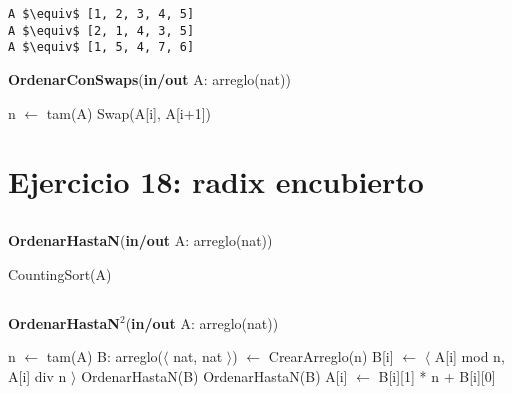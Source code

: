 \begin{lstlisting}
A $\equiv$ [1, 2, 3, 4, 5]
A $\equiv$ [2, 1, 4, 3, 5]
A $\equiv$ [1, 5, 4, 7, 6]
\end{lstlisting}

\begin{algorithm}[H]
\caption{
    \textbf{OrdenarConSwaps}(\textbf{in/out} A: arreglo(nat))
}
\begin{algorithmic}[1]
    \State n $\gets$ tam(A)
     
            \State Swap(A[i], A[i+1])
        \EndIf
    \EndFor
\end{algorithmic}
\end{algorithm}

\section{Ejercicio 18: radix encubierto}

\subsection{}

\begin{algorithm}[H]
\caption{
    \textbf{OrdenarHastaN}(\textbf{in/out} A: arreglo(nat))
}
\begin{algorithmic}[1]
    \State CountingSort(A) 
\end{algorithmic}
\end{algorithm}

\subsection{}

\begin{algorithm}[H]
\caption{
    \textbf{OrdenarHastaN$^2$}(\textbf{in/out} A: arreglo(nat))
}
\begin{algorithmic}[1]
    \State n $\gets$ tam(A)
    \State B: arreglo($\langle$ nat, nat $\rangle$) $\gets$ CrearArreglo(n) 
     
        \State B[i] $\gets$ $\langle$ A[i] mod n, A[i] div n $\rangle$
    \EndFor
    \State OrdenarHastaN(B) 
    \State OrdenarHastaN(B) 
     
        \State A[i] $\gets$ B[i][1] * n + B[i][0]
    \EndFor
\end{algorithmic}
\end{algorithm}

